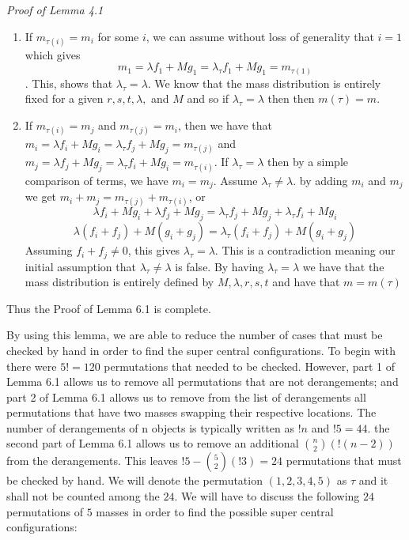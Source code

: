 \documentclass[11pt,leqno]{article}
\theoremstyle{definition}
\theoremstyle{remark}
\numberwithin{equation}{section}
\begin{document}
\textit{Proof of Lemma 4.1}
\begin{enumerate}
\item If $m_{\tau(i)}=m_i$ for some $i$, we can assume without loss of generality that $i=1$ which gives
$$ m_1=\lambda f_1+M g_1=\lambda_\tau f_1+M g_1=m_{\tau(1)}$$. This, shows that $\lambda_\tau=\lambda$. We know that the mass distribution is entirely fixed for a given $r,s,t,\lambda,$ and $M$ and so if $\lambda_\tau=\lambda$ then then $m(\tau)=m$.

\item If $m_{\tau(i)}=m_j$ and $m_{\tau(j)}=m_i$, then we have that $m_i=\lambda f_i +M g_i=\lambda_\tau f_j + M g_j=m_{\tau(j)}$ and $m_j=\lambda f_j +M g_j=\lambda_\tau f_i + M g_i=m_{\tau(i)}$. If $\lambda_\tau=\lambda$ then by a simple comparison of terms, we have $m_i=m_j$. Assume $\lambda_\tau \neq \lambda$. by adding $m_i$ and $m_j$ we get $m_i+m_j=m_{\tau(j)}+m_{\tau(i)}$, or 
$$\lambda f_i +M g_i+\lambda f_j +M g_j=\lambda_\tau f_j +M g_j+\lambda_\tau f_i + M g_i $$
$$\lambda (f_i +f_j) +M (g_i+g_j)=\lambda_\tau (f_i+f_j)+M(g_i+g_j)$$
Assuming $f_i+f_j \neq 0$, this gives $\lambda_\tau=\lambda$. This is a contradiction meaning our initial assumption that $\lambda_\tau \neq \lambda$ is false. By having $\lambda_\tau=\lambda$ we have that the mass distribution is entirely defined by $M, \lambda, r,s,t$ and have that $m=m(\tau)$
\end{enumerate}
Thus the Proof of Lemma 6.1 is complete.

By using this lemma, we are able to reduce the number of cases that must be checked by hand in order to find the super central configurations. To begin with there were $5!=120$ permutations that needed to be checked. 
However, part 1 of Lemma 6.1 allows us to remove all permutations that are not derangements; and part 2 of Lemma 6.1 allows us to remove from the list of derangements all permutations that have two masses swapping their respective locations. 
The number of derangements of n objects is typically written as $!n$ and $!5=44$. the second part of Lemma 6.1 allows us to remove an additional ${n \choose 2} (!(n-2))$ from the derangements. 
This leaves $!5-{5\choose 2}(!3)=24$ permutations that must be checked by hand. We will denote the permutation $(1,2,3,4,5)$ as $\tau$ and it shall not be counted among the $24$. We will have to discuss the following $24$ permutations of $5$ masses in order to find the possible super central configurations:
\end{document}
